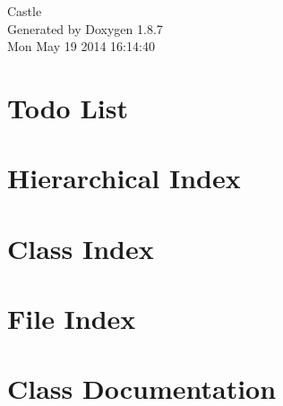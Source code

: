 \documentclass[twoside]{book}
\newcommand{\+}{\discretionary{\mbox{\scriptsize$\hookleftarrow$}}{}{}}
\newcommand{\clearemptydoublepage}{%
  \newpage{\pagestyle{empty}\cleardoublepage}%
}
\begin{document}
\hypersetup{pageanchor=false,
             bookmarks=true,
             bookmarksnumbered=true,
             pdfencoding=unicode
            }
\begin{titlepage}
\vspace*{7cm}
\begin{center}%
{\Large Castle }\\
\vspace*{1cm}
{\large Generated by Doxygen 1.8.7}\\
\vspace*{0.5cm}
{\small Mon May 19 2014 16:14:40}\\
\end{center}
\end{titlepage}
\clearemptydoublepage
\tableofcontents
\clearemptydoublepage
{}
\hypersetup{pageanchor=true}

\chapter{Todo List}
\label{todo}
\hypertarget{todo}{}

\chapter{Hierarchical Index}

\chapter{Class Index}

\chapter{File Index}

\chapter{Class Documentation}






















\end{document}

